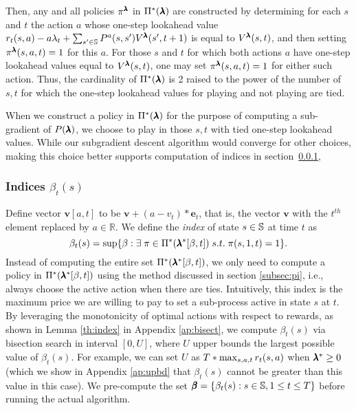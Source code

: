 Then, any and all policies $\pi^{\pmb{\lambda}}$ in $\Pi^*(\pmb{\lambda})$ are constructed by determining for each $s$ and $t$ the action $a$ whose one-step lookahead value $r_t(s,a)-a\lambda_t+\sum_{s'\in\mathbb{S}}P^{a}(s,s')V^{\pmb{\lambda}}(s',t+1)$ is equal to $V^{\pmb{\lambda}}(s,t)$, and then setting $\pi^{\pmb{\lambda}}(s,a,t)=1$ for this $a$.
For those $s$ and $t$ for which both actions $a$ have one-step lookahead values equal to $V^{\pmb{\lambda}}(s,t)$, one may set $\pi^{\pmb{\lambda}}(s,a,t)=1$ for either such action.
Thus, the cardinality of $\Pi^*(\pmb{\lambda})$ is 2 raised to the power of the number of $s,t$ for which the one-step lookahead values for playing and not playing are tied.

When we construct a policy in $\Pi^*(\pmb{\lambda})$ for the purpose of computing a sub-gradient of $P(\pmb{\lambda})$, we choose to play in those $s,t$ with tied one-step lookahead values. 
While our subgradient descent algorithm would converge for other choices, making this choice better supports computation of indices in section~\ref{subsec:beta}, 

\subsubsection{Indices $\beta_t(s)$}
\label{subsec:beta}
Define vector $\mathbf{v}[a,t]$ to be $\mathbf{v}+(a-v_t)*\mathbf{e}_t$, that is, the vector $\mathbf{v}$ with the $t^{th}$ element replaced by $a\in\mathbb{R}$. 
We define the \textit{index} of state $s\in\mathbb{S}$ at time $t$ as
\begin{equation}\label{df:index}
\beta_t(s) = \sup\{\beta: \exists \; \pi\in\Pi^*(\pmb{\lambda}^*[\beta,t]) \;s.t.\; \pi(s,1,t)=1\}.
\end{equation} 
Instead of computing the entire set $\Pi^*(\pmb{\lambda}^*[\beta,t])$, we only need to compute a policy in $\Pi^*(\pmb{\lambda}^*[\beta,t])$ using the method discussed in section \ref{subsec:pi}, i.e., always choose the active action when there are ties. Intuitively, this index is the maximum price we are willing to pay to set a sub-process active in state $s$ at $t$.
By leveraging the monotonicity of optimal actions with respect to rewards, as shown in Lemma \ref{th:index} in Appendix \ref{ap:bisect}, we compute $\beta_t(s)$ via bisection search in interval $[0,U]$, where $U$ upper bounds the largest possible value of $\beta_t(s)$. For example, we can set $U$ as $T* \max_{s,a,t}r_t(s,a)$ when $\pmb{\lambda}^*\geq 0$ (which we show in Appendix \ref{ap:upbd} that $\beta_t(s)$ cannot be greater than this value in this case). We pre-compute the set $\pmb{\beta}=\{\beta_t(s):s\in\mathbb{S},1\leq t\leq T\}$ before running the actual algorithm.

